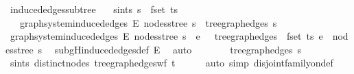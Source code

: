 \begin{isabellebody}
{\isafoldproof}%
%
\isadelimproof
\isanewline
%
\endisadelimproof
\isanewline
{}\isamarkupfalse%
\ induced{\isacharunderscore}{\kern0pt}edges{\isacharunderscore}{\kern0pt}subtree{\isacharcolon}{\kern0pt}\isanewline
\ \ \ s{\isacharunderscore}{\kern0pt}in{\isacharunderscore}{\kern0pt}ts{\isacharcolon}{\kern0pt}\ {\isachardoublequoteopen}s\ {\isasymin}\ fset\ ts{\isachardoublequoteclose}\isanewline
\ \ \ {\isachardoublequoteopen}graph{\isacharunderscore}{\kern0pt}system{\isachardot}{\kern0pt}induced{\isacharunderscore}{\kern0pt}edges\ E{\isacharprime}{\kern0pt}\ {\isacharparenleft}{\kern0pt}nodes{\isacharunderscore}{\kern0pt}stree\ s{\isacharparenright}{\kern0pt}\ {\isacharequal}{\kern0pt}\ tree{\isacharunderscore}{\kern0pt}graph{\isacharunderscore}{\kern0pt}edges\ s{\isachardoublequoteclose}\isanewline
%
\isadelimproof
%
\endisadelimproof
%
\isatagproof
{}\isamarkupfalse%
{\isacharminus}{\kern0pt}\isanewline
\ \ \isamarkupfalse%
\ {\isachardoublequoteopen}graph{\isacharunderscore}{\kern0pt}system{\isachardot}{\kern0pt}induced{\isacharunderscore}{\kern0pt}edges\ E{\isacharprime}{\kern0pt}\ {\isacharparenleft}{\kern0pt}nodes{\isacharunderscore}{\kern0pt}stree\ s{\isacharparenright}{\kern0pt}\ {\isacharequal}{\kern0pt}\ {\isacharbraceleft}{\kern0pt}e\ {\isasymin}\ {\isasymUnion}\ {\isacharparenleft}{\kern0pt}tree{\isacharunderscore}{\kern0pt}graph{\isacharunderscore}{\kern0pt}edges\ {\isacharbackquote}{\kern0pt}\ fset\ ts{\isacharparenright}{\kern0pt}{\isachardot}{\kern0pt}\ e\ {\isasymsubseteq}\ nodes{\isacharunderscore}{\kern0pt}stree\ s{\isacharbraceright}{\kern0pt}{\isachardoublequoteclose}\ \isamarkupfalse%
\ subg{\isachardot}{\kern0pt}H{\isachardot}{\kern0pt}induced{\isacharunderscore}{\kern0pt}edges{\isacharunderscore}{\kern0pt}def\ E{\isacharprime}{\kern0pt}\ \isamarkupfalse%
\ auto\isanewline
\ \ \isamarkupfalse%
\ \isamarkupfalse%
\ {\isachardoublequoteopen}{\isasymdots}\ {\isacharequal}{\kern0pt}\ tree{\isacharunderscore}{\kern0pt}graph{\isacharunderscore}{\kern0pt}edges\ s{\isachardoublequoteclose}\isanewline
\ \ \ \ \isamarkupfalse%
\ s{\isacharunderscore}{\kern0pt}in{\isacharunderscore}{\kern0pt}ts\ distinct{\isacharunderscore}{\kern0pt}nodes\ tree{\isacharunderscore}{\kern0pt}graph{\isacharunderscore}{\kern0pt}edges{\isacharunderscore}{\kern0pt}wf\ t\isanewline
\ \ \ \ \isamarkupfalse%
\ {\isacharparenleft}{\kern0pt}auto\ simp{\isacharcolon}{\kern0pt}\ disjoint{\isacharunderscore}{\kern0pt}family{\isacharunderscore}{\kern0pt}on{\isacharunderscore}{\kern0pt}def{\isacharcomma}{\kern0pt}\isanewline

\end{isabellebody}
